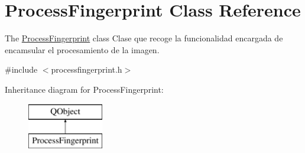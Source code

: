 \hypertarget{class_process_fingerprint}{\section{Process\+Fingerprint Class Reference}
\label{class_process_fingerprint}
}


The \hyperlink{class_process_fingerprint}{Process\+Fingerprint} class Clase que recoge la funcionalidad encargada de encamsular el procesamiento de la imagen.  




{\ttfamily \#include $<$processfingerprint.\+h$>$}

Inheritance diagram for Process\+Fingerprint\+:\begin{figure}[H]
\begin{center}
\leavevmode
\includegraphics[height=2.000000cm]{class_process_fingerprint}
\end{center}
\end{figure}
